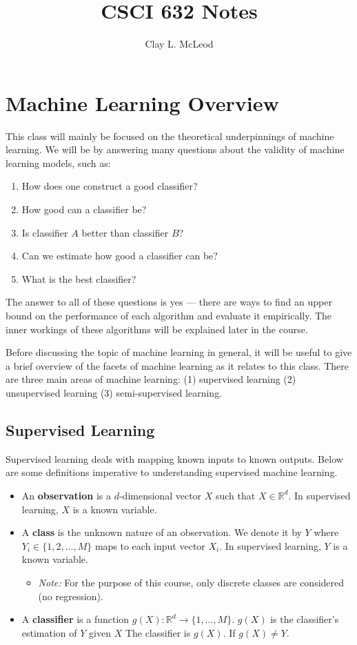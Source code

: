 \documentclass[12pt]{article}
\title{\textbf{CSCI 632 Notes}}
\author{Clay L. McLeod}
\begin{document}
\maketitle

\section{Machine Learning Overview}

This class will mainly be focused on the theoretical underpinnings of machine learning. We will be by answering many questions about the validity of machine learning models, such as:

\begin{enumerate}[noitemsep]
\item How does one construct a good classifier?
\item How good can a classifier be?
\item Is classifier $A$ better than classifier $B$?
\item Can we estimate how good a classifier can be?
\item What is the best classifier?
\end{enumerate}
    
The answer to all of these questions is yes --- there are ways to find an upper bound on the performance of each algorithm and evaluate it empirically. The inner workings of these algorithms will be explained later in the course.

Before discussing the topic of machine learning in general, it will be useful to give a brief overview of the facets of machine learning as it relates to this class. There are three main areas of machine learning: (1) supervised learning (2) unsupervised learning (3) semi-supervised learning.

\subsection{Supervised Learning}

Supervised learning deals with mapping known inputs to known outputs. Below are some definitions imperative to understanding supervised machine learning.

\begin{itemize}[noitemsep]
\item An \textbf{observation} is a $d$-dimensional vector $X$ such that $X \in \mathbb{R}^{d}$. In supervised learning, $X$ is a known variable.
\item A \textbf{class} is the unknown nature of an observation. We denote it by $Y$ where $Y_i \in \{1, 2, ..., M\}$ maps to each input vector $X_i$. In supervised learning, $Y$ is a known variable.
\begin{itemize}
\item \textit{Note:} For the purpose of this course, only discrete classes are considered (no regression).
\end{itemize}
\item A \textbf{classifier} is a function $g(X): \mathbb{R}^{d} \rightarrow \{1, ..., M\}$. $g(X)$ is the classifier's estimation of $Y$ given $X$ The classifier is $g(X)$. If $g(X) \neq Y$.
\end{itemize}
\end{document}

